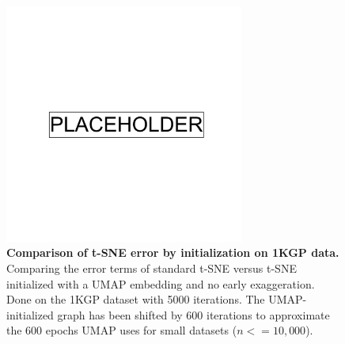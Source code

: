 \newpage

\begin{figure}[!htb]
    \centering
    \includegraphics[width=0.7\textwidth]{placeholder.png}
    \caption[Comparison of t-SNE error by initialization on 1KGP data]{\textbf{Comparison of t-SNE error by initialization on 1KGP data.} Comparing the error terms of standard t-SNE versus t-SNE initialized with a UMAP embedding and no early exaggeration. Done on the 1KGP dataset with 5000 iterations. The UMAP-initialized graph has been shifted by 600 iterations to approximate the 600 epochs UMAP uses for small datasets ($n<=10,000$).}
    \label{fig:supp_tsne_umap_compare_1kgp_graph}
\end{figure}

\newpage

